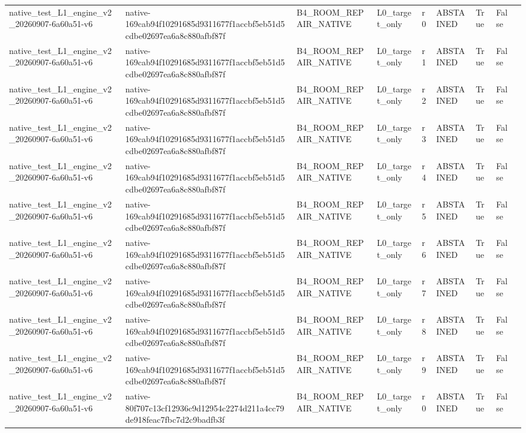 \begin{tabular}{lllllllll}
native\_test\_L1\_engine\_v2\_20260907-6a60a51-v6 & native-169cab94f10291685d9311677f1accbf5eb51d5cdbe02697ea6a8c880afbf87f & B4\_ROOM\_REPAIR\_NATIVE & L0\_target\_only & r0 & ABSTAINED & True & False &  \\
native\_test\_L1\_engine\_v2\_20260907-6a60a51-v6 & native-169cab94f10291685d9311677f1accbf5eb51d5cdbe02697ea6a8c880afbf87f & B4\_ROOM\_REPAIR\_NATIVE & L0\_target\_only & r1 & ABSTAINED & True & False &  \\
native\_test\_L1\_engine\_v2\_20260907-6a60a51-v6 & native-169cab94f10291685d9311677f1accbf5eb51d5cdbe02697ea6a8c880afbf87f & B4\_ROOM\_REPAIR\_NATIVE & L0\_target\_only & r2 & ABSTAINED & True & False &  \\
native\_test\_L1\_engine\_v2\_20260907-6a60a51-v6 & native-169cab94f10291685d9311677f1accbf5eb51d5cdbe02697ea6a8c880afbf87f & B4\_ROOM\_REPAIR\_NATIVE & L0\_target\_only & r3 & ABSTAINED & True & False &  \\
native\_test\_L1\_engine\_v2\_20260907-6a60a51-v6 & native-169cab94f10291685d9311677f1accbf5eb51d5cdbe02697ea6a8c880afbf87f & B4\_ROOM\_REPAIR\_NATIVE & L0\_target\_only & r4 & ABSTAINED & True & False &  \\
native\_test\_L1\_engine\_v2\_20260907-6a60a51-v6 & native-169cab94f10291685d9311677f1accbf5eb51d5cdbe02697ea6a8c880afbf87f & B4\_ROOM\_REPAIR\_NATIVE & L0\_target\_only & r5 & ABSTAINED & True & False &  \\
native\_test\_L1\_engine\_v2\_20260907-6a60a51-v6 & native-169cab94f10291685d9311677f1accbf5eb51d5cdbe02697ea6a8c880afbf87f & B4\_ROOM\_REPAIR\_NATIVE & L0\_target\_only & r6 & ABSTAINED & True & False &  \\
native\_test\_L1\_engine\_v2\_20260907-6a60a51-v6 & native-169cab94f10291685d9311677f1accbf5eb51d5cdbe02697ea6a8c880afbf87f & B4\_ROOM\_REPAIR\_NATIVE & L0\_target\_only & r7 & ABSTAINED & True & False &  \\
native\_test\_L1\_engine\_v2\_20260907-6a60a51-v6 & native-169cab94f10291685d9311677f1accbf5eb51d5cdbe02697ea6a8c880afbf87f & B4\_ROOM\_REPAIR\_NATIVE & L0\_target\_only & r8 & ABSTAINED & True & False &  \\
native\_test\_L1\_engine\_v2\_20260907-6a60a51-v6 & native-169cab94f10291685d9311677f1accbf5eb51d5cdbe02697ea6a8c880afbf87f & B4\_ROOM\_REPAIR\_NATIVE & L0\_target\_only & r9 & ABSTAINED & True & False &  \\
native\_test\_L1\_engine\_v2\_20260907-6a60a51-v6 & native-80f707c13cf12936c9d12954c2274d211a4cc79de918feac7fbc7d2c9badfb3f & B4\_ROOM\_REPAIR\_NATIVE & L0\_target\_only & r0 & ABSTAINED & True & False &  \\

\end{tabular}
